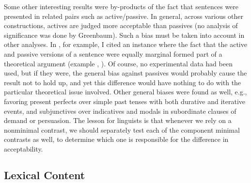 Some other interesting results were by-products of the fact that sentences were presented in related pairs such as active/passive. In general, across various other constructions, actives are judged more acceptable than passives (no analysis of significance was done by Greenbaum). Such a bias must be taken into account in other analyses. In , for example, I cited an instance where the fact that the active and passive versions of a sentence were equally marginal formed part of a theoretical argument (example , ). Of course, no experimental data had been used, but if they were, the general bias against passives would probably cause the result not to hold up, and yet this difference would have nothing to do with the particular theoretical issue involved. Other general biases were found as well, e.g., favoring present perfects over simple past tenses with both durative and iterative events, and subjunctives over indicatives and modals in subordinate clauses of demand or persuasion. The lesson for linguists is that whenever we rely on a nonminimal contrast, we should separately test each of the component minimal contrasts as well, to determine which one is responsible for the difference in acceptability.

\subsection{Lexical Content}\label{sec:5.3.5} 

